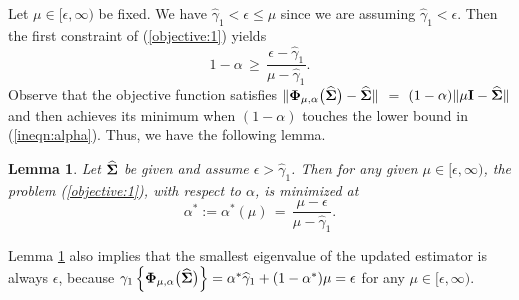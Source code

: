 \documentclass[times,sort&compress,3p]{elsarticle}
\newtheorem{lemma}{Lemma}
\begin{document}
Let  $\mu \in [\epsilon, \infty)$ be fixed. We have $\widehat{\gamma}_{1} < \epsilon \leq \mu$ 
since we are assuming $\widehat{\gamma}_{1} < \epsilon$. Then the first constraint of (\ref{objective:1}) yields
\begin{equation}\label{ineqn:alpha}
 1-\alpha \,\geq\,
 	\frac{\epsilon - \widehat{\gamma}_{1}}{\mu - \widehat{\gamma}_{1}}.
\end{equation}
Observe that the objective function satisfies 
$\| {\bf \Phi}_{\mu, \alpha}\big(\widehat{\bf \Sigma}\big) - \widehat{\bf \Sigma} \|$ $=$ $(1 - \alpha) \| \mu {\bf I} - \widehat{\bf \Sigma} \|$ and then achieves its minimum when $(1-\alpha)$ touches the lower bound in (\ref{ineqn:alpha}).
Thus, we have the following lemma.
%
\begin{lemma}\label{lemma:alpha} Let $\widehat{\bf \Sigma}$ be given and assume $\epsilon > \widehat{\gamma}_{1}$. Then for any given $\mu \in [\epsilon, \infty)$, the problem (\ref{objective:1}), with respect to $\alpha$, is minimized at
\begin{equation}\label{eqn:alpha}
  \alpha^* := \alpha^*(\mu) \,=\,
 	\frac{\mu - \epsilon}{\mu - \widehat{\gamma}_{1}}.
\end{equation}
\end{lemma}
%
\noindent Lemma \ref{lemma:alpha} also implies that the smallest eigenvalue of the updated estimator is always $\epsilon$, because 
$\gamma_1 \left\{ {\bf \Phi}_{\mu, \alpha}\big(\widehat{\bf \Sigma}\big) \right\}
= \alpha^* \widehat{\gamma}_1 + (1 - \alpha^*) \mu = \epsilon$  for any $\mu \in [\epsilon, \infty)$. 
\end{document}
